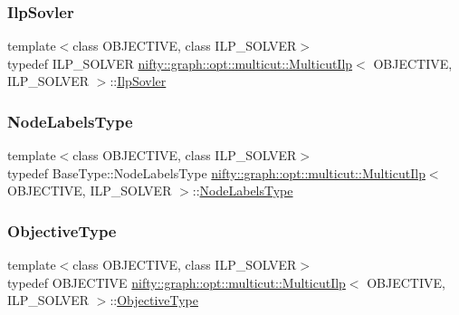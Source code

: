 \subsubsection{\texorpdfstring{Ilp\+Sovler}{IlpSovler}}
{\footnotesize\ttfamily template$<$class O\+B\+J\+E\+C\+T\+I\+VE, class I\+L\+P\+\_\+\+S\+O\+L\+V\+ER$>$ \\
typedef I\+L\+P\+\_\+\+S\+O\+L\+V\+ER \hyperlink{classnifty_1_1graph_1_1opt_1_1multicut_1_1MulticutIlp}{nifty\+::graph\+::opt\+::multicut\+::\+Multicut\+Ilp}$<$ O\+B\+J\+E\+C\+T\+I\+VE, I\+L\+P\+\_\+\+S\+O\+L\+V\+ER $>$\+::\hyperlink{classnifty_1_1graph_1_1opt_1_1multicut_1_1MulticutIlp_a981964ae77e95e0f0754ab51df67f6a5}{Ilp\+Sovler}}

\mbox{\label{classnifty_1_1graph_1_1opt_1_1multicut_1_1MulticutIlp_a0e1396c7332495a1d4af41e5df69398b}} 
\subsubsection{\texorpdfstring{Node\+Labels\+Type}{NodeLabelsType}}
{\footnotesize\ttfamily template$<$class O\+B\+J\+E\+C\+T\+I\+VE, class I\+L\+P\+\_\+\+S\+O\+L\+V\+ER$>$ \\
typedef Base\+Type\+::\+Node\+Labels\+Type \hyperlink{classnifty_1_1graph_1_1opt_1_1multicut_1_1MulticutIlp}{nifty\+::graph\+::opt\+::multicut\+::\+Multicut\+Ilp}$<$ O\+B\+J\+E\+C\+T\+I\+VE, I\+L\+P\+\_\+\+S\+O\+L\+V\+ER $>$\+::\hyperlink{classnifty_1_1graph_1_1opt_1_1multicut_1_1MulticutIlp_a0e1396c7332495a1d4af41e5df69398b}{Node\+Labels\+Type}}

\mbox{\label{classnifty_1_1graph_1_1opt_1_1multicut_1_1MulticutIlp_acd5485d2d20d1e89c5202fc677993d5a}} 
\subsubsection{\texorpdfstring{Objective\+Type}{ObjectiveType}}
{\footnotesize\ttfamily template$<$class O\+B\+J\+E\+C\+T\+I\+VE, class I\+L\+P\+\_\+\+S\+O\+L\+V\+ER$>$ \\
typedef O\+B\+J\+E\+C\+T\+I\+VE \hyperlink{classnifty_1_1graph_1_1opt_1_1multicut_1_1MulticutIlp}{nifty\+::graph\+::opt\+::multicut\+::\+Multicut\+Ilp}$<$ O\+B\+J\+E\+C\+T\+I\+VE, I\+L\+P\+\_\+\+S\+O\+L\+V\+ER $>$\+::\hyperlink{classnifty_1_1graph_1_1opt_1_1multicut_1_1MulticutIlp_acd5485d2d20d1e89c5202fc677993d5a}{Objective\+Type}}

